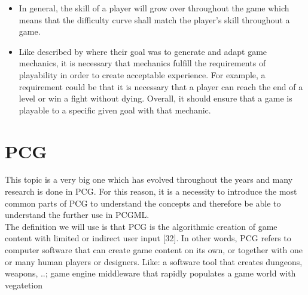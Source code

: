 \documentclass[MGS,Master,english]{twbook}%
\begin{document}
\begin{itemize}
	\item In general, the skill of a player will grow over throughout the game which means that the difficulty curve shall match the player's skill throughout a game. \cite{mechanic::gamasutra::DanielDoan}
	\item Like described by \cite{mechanic::generateAndAdaptingMechanics} where their goal was to generate and adapt game mechanics, it is necessary that mechanics fulfill the requirements of playability in order to create acceptable experience. For example, a requirement could be that it is necessary that a player can reach the end of a level or win a fight without dying. Overall, it should ensure that a game is playable to a specific given goal with that mechanic.
\end{itemize} 


%
%
\clearpage
\chapter{\acl{PCG}}
This topic is a very big one which has evolved throughout the years and many research is done in \ac{PCG}. For this reason, it is a necessity to introduce the most common parts of PCG to understand the concepts and therefore be able to understand the further use in \ac{PCGML}.\\

The definition we will use is that PCG is the algorithmic creation of game content with limited or indirect user input [32]. In other words, PCG refers to computer software that can create game content on its own, or together with one or many human players or designers. \cite{pcg::whatIsPCG}
Like: a software tool that creates dungeons, weapons, ..; game engine middleware that rapidly populates a game world with vegatetion
\end{document}
